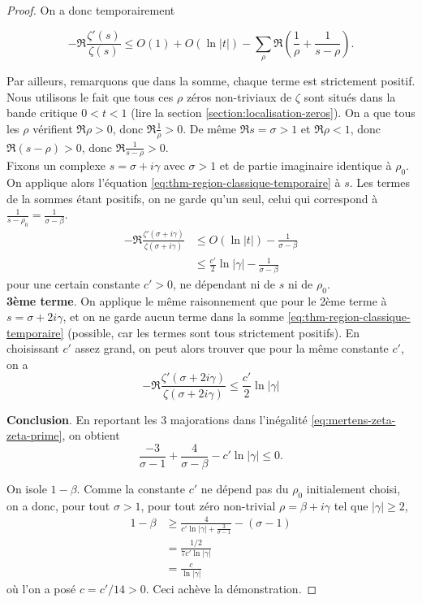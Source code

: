 \documentclass[french]{report}
\begin{document}
\begin{proof}
  On a donc temporairement

  \begin{equation}\label{eq:thm-region-classique-temporaire}
    - \Re\frac{\zeta'(s)}{\zeta(s)}
    \leq O(1)
    + O(\ln|t|)
    - \sum_{\rho}\Re\left(\frac{1}{\rho} + \frac{1}{s-\rho} \right).
  \end{equation}

  Par ailleurs, remarquons que dans la somme, chaque terme est strictement positif. Nous utilisons le fait que tous ces $\rho$ zéros non-triviaux de $\zeta$ sont situés dans la bande critique $0<t<1$ (lire la section \ref{section:localisation-zeros}). On a que tous les $\rho$ vérifient $\Re\rho>0$, donc $\Re\frac{1}{\rho}>0$. De même $\Re s=\sigma>1$ et $\Re\rho<1$, donc $\Re(s-\rho)>0$, donc $\Re\frac{1}{s-\rho}>0$. 
  \\

  Fixons un complexe $s=\sigma+i\gamma$ avec $\sigma>1$ et de partie imaginaire identique à $\rho_0$. On applique alors l'équation \ref{eq:thm-region-classique-temporaire} à $s$. Les termes de la sommes étant positifs, on ne garde qu'un seul, celui qui correspond à $\frac{1}{s-\rho_0}=\frac{1}{\sigma-\beta}$.
  \begin{align*}
    - \Re\frac{\zeta'(\sigma+i\gamma)}{\zeta(\sigma+i\gamma)}
    &\leq O(\ln|t|)
    -\frac{1}{\sigma-\beta} \\
    &\leq\frac{c'}{2}\ln|\gamma|
    -\frac{1}{\sigma-\beta}
  \end{align*}
  pour une certain constante $c'>0$, ne dépendant ni de $s$ ni de $\rho_0$.
  \\

  \textbf{3ème terme}. On applique le même raisonnement que pour le 2ème terme à $s=\sigma+2i\gamma$, et on ne garde aucun terme dans la somme \ref{eq:thm-region-classique-temporaire} (possible, car les termes sont tous strictement positifs).
  En choisissant $c'$ assez grand, on peut alors trouver que pour la même constante $c'$, on a
  \[
    - \Re\frac{\zeta'(\sigma+2i\gamma)}{\zeta(\sigma+2i\gamma)}
    \leq\frac{c'}{2}\ln|\gamma|
  \]

  \textbf{Conclusion}. En reportant les 3 majorations dans l'inégalité \ref{eq:mertens-zeta-zeta-prime}, on obtient
  \[
    \frac{-3}{\sigma-1}+\frac{4}{\sigma-\beta}-c'\ln|\gamma|\leq0.
  \]

  On isole $1-\beta$. Comme la constante $c'$ ne dépend pas du $\rho_0$ initialement choisi, on a donc, pour tout $\sigma>1$, pour tout zéro non-trivial $\rho=\beta+i\gamma$ tel que $|\gamma|\geq2$,
  \begin{align*}
    1-\beta
    &\geq \frac{4}{c'\ln|\gamma|+\frac{3}{\sigma-1}} - (\sigma -1) \\
    &=\frac{1/2}{7c'\ln|\gamma|} \\
    &=\frac{c}{\ln|\gamma|}
  \end{align*}
  où l'on a posé $c=c'/14>0$. Ceci achève la démonstration.
\end{proof}
\end{document}
